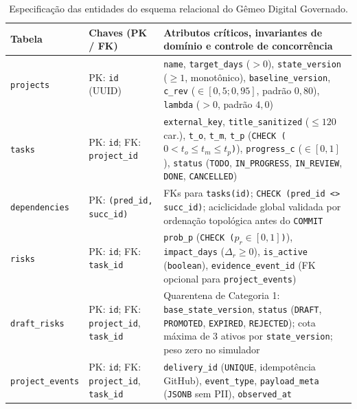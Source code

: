 \documentclass[12pt,openany,oneside,a4paper,english,brazilian,sumario=tradicional]{abntex2}
\begin{document}
\begin{table}[htbp]
\caption{Especificação das entidades do esquema relacional do Gêmeo Digital Governado.}\label{tab:esquema_er}
{\scriptsize
\setlength{\tabcolsep}{3pt}
\begin{tabularx}{\textwidth}{L{3.35cm} L{2.75cm} Y}
\toprule
\textbf{Tabela} & \textbf{Chaves (PK / FK)} & \textbf{Atributos críticos, invariantes de domínio e controle de concorrência}\\
\midrule
\texttt{projects} & PK: \texttt{id} (UUID) & \texttt{name}, \texttt{target\_\allowbreak days} ($>0$), \texttt{state\_\allowbreak version} ($\ge 1$, monotônico), \texttt{baseline\_\allowbreak version}, \texttt{c\_\allowbreak rev} ($\in [0{,}5;0{,}95]$, padrão $0{,}80$), \texttt{lambda} ($>0$, padrão $4{,}0$)\\
\texttt{tasks} & PK: \texttt{id}; FK: \texttt{project\_\allowbreak id} & \texttt{external\_\allowbreak key}, \texttt{title\_\allowbreak sanitized} ($\le 120$ car.), \texttt{t\_\allowbreak o}, \texttt{t\_\allowbreak m}, \texttt{t\_\allowbreak p} (\texttt{CHECK ($0 < t_o \le t_m \le t_p$)}), \texttt{progress\_\allowbreak c} ($\in [0,1]$), \texttt{status} (\texttt{TODO}, \texttt{IN\_\allowbreak PROGRESS}, \texttt{IN\_\allowbreak REVIEW}, \texttt{DONE}, \texttt{CANCELLED})\\
\texttt{dependencies} & PK: \texttt{(pred\_\allowbreak id, succ\_\allowbreak id)} & FKs para \texttt{tasks(id)}; \texttt{CHECK (pred\_\allowbreak id <> succ\_\allowbreak id)}; aciclicidade global validada por ordenação topológica antes do \texttt{COMMIT}\\
\texttt{risks} & PK: \texttt{id}; FK: \texttt{task\_\allowbreak id} & \texttt{prob\_\allowbreak p} (\texttt{CHECK ($p_r \in [0,1]$)}), \texttt{impact\_\allowbreak days} ($\Delta_r \ge 0$), \texttt{is\_\allowbreak active} (\texttt{boolean}), \texttt{evidence\_\allowbreak event\_\allowbreak id} (FK opcional para \texttt{project\_\allowbreak events})\\
\texttt{draft\_\allowbreak risks} & PK: \texttt{id}; FK: \texttt{project\_\allowbreak id}, \texttt{task\_\allowbreak id} & Quarentena de Categoria 1: \texttt{base\_\allowbreak state\_\allowbreak version}, \texttt{status} (\texttt{DRAFT}, \texttt{PROMOTED}, \texttt{EXPIRED}, \texttt{REJECTED}); cota máxima de 3 ativos por \texttt{state\_\allowbreak version}; peso zero no simulador\\
\texttt{project\_\allowbreak events} & PK: \texttt{id}; FK: \texttt{project\_\allowbreak id}, \texttt{task\_\allowbreak id} & \texttt{delivery\_\allowbreak id} (\texttt{UNIQUE}, idempotência GitHub), \texttt{event\_\allowbreak type}, \texttt{payload\_\allowbreak meta} (\texttt{JSONB} sem PII), \texttt{observed\_\allowbreak at}\\

\end{tabularx}}
\end{table}
\end{document}
